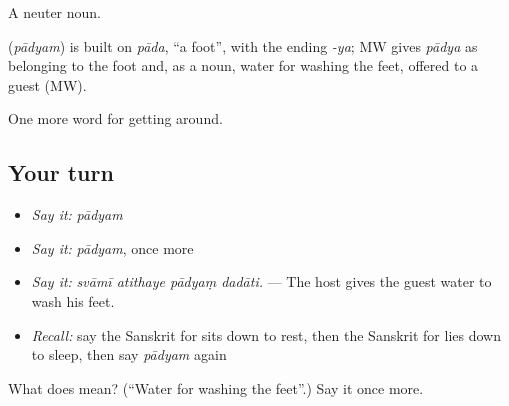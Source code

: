 A neuter noun.

\begin{cousinweb}
\textbf{} (\emph{pādyam}) is built on \emph{pāda}, \textquotedblleft{}a foot\textquotedblright{}, with the ending \emph{-ya}; MW gives \emph{pādya} as belonging to the foot and, as a noun, water for washing the feet, offered to a guest (MW).
\end{cousinweb}

\begin{grammarlens}[title={What you've built}]
One more word for getting around.
\end{grammarlens}

\subsection*{Your turn}
\begin{itemize}
\raggedright
  \item \emph{Say it:} \emph{pādyam}
  \item \emph{Say it:} \emph{pādyam}, once more
  \item \emph{Say it:} \emph{svāmī atithaye pādyaṃ dadāti.} — The host gives the guest water to wash his feet.
  \item \emph{Recall:} say the Sanskrit for sits down to rest, then the Sanskrit for lies down to sleep, then say \emph{pādyam} again
\end{itemize}

\begin{tcolorbox}[breakable,colback=teal!4,colframe=teal!35!black,title={Before you move on}]
What does  mean? (\textquotedblleft{}Water for washing the feet\textquotedblright{}.) Say it once more.
\end{tcolorbox}
